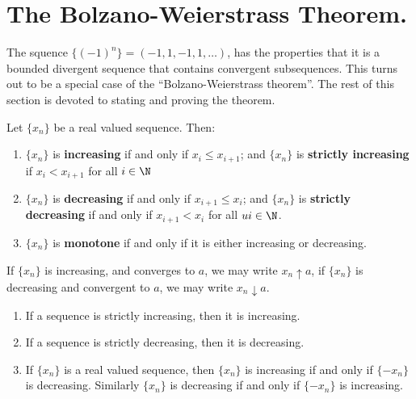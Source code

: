 
\section{The Bolzano-Weierstrass Theorem.}

The squence $\{(-1)^n\}=(-1,1,-1,1,\dots)$, has the properties that it is a 
bounded divergent sequence that contains convergent subsequences. This turns out 
to be a special case of the ``Bolzano-Weierstrass theorem''. The rest of this 
section is devoted to stating and proving the theorem.

\begin{definition}
    Let $\{x_n\}$ be a real valued sequence. Then:
        \begin{enumerate}[label=(\arabic*)]
            \item $\{x_n\}$ is \textbf{increasing} if and only if $x_i \leq 
                x_{i+1}$; and $\{x_n\}$ is  \textbf{strictly increasing} if 
                $x_i < x_{i+1}$ for all $i \in \N$

            \item $\{x_n\}$ is \textbf{decreasing} if and only if $x_{i+1} \leq 
                x_i$; and  $\{x_n\}$ is  \textbf{strictly decreasing} if and 
                only if $x_{i+1}<x_i$ for all  $ui \in \N$.

            \item $\{x_n\}$ is \textbf{monotone} if and only if it is either 
                increasing or decreasing.
        \end{enumerate}
\end{definition}

If $\{x_n\}$ is increasing, and converges to  $a$, we may write  $x_n \uparrow a$, 
if $\{x_n\}$ is decreasing and convergent to  $a$, we may write  $x_n \downarrow 
a$. 
\begin{claim} 
    \begin{enumerate}[label=(\arabic*)]
        \item If a sequence is strictly increasing, then it is increasing.

        \item If a sequence is strictly decreasing, then it is decreasing.

        \item If $\{x_n\}$ is a real valued sequence, then  $\{x_n\}$ is 
            increasing if and only if  $\{-x_n\}$ is decreasing. Similarly 
            $\{x_n\}$ is decreasing if and only if $\{-x_n\}$ is increasing.
    \end{enumerate}
\end{claim}

